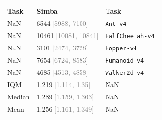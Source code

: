 \begin{tabular}{lll}
\toprule
Task & Simba & \textbf{Task} \\
\midrule
NaN & 6544 \textcolor{gray}{[5988, 7100]} & \texttt{Ant-v4} \\
NaN & 10461 \textcolor{gray}{[10081, 10841]} & \texttt{HalfCheetah-v4} \\
NaN & 3101 \textcolor{gray}{[2474, 3728]} & \texttt{Hopper-v4} \\
NaN & 7654 \textcolor{gray}{[6724, 8583]} & \texttt{Humanoid-v4} \\
NaN & 4685 \textcolor{gray}{[4513, 4858]} & \texttt{Walker2d-v4} \\
IQM & 1.219 \textcolor{gray}{[1.114, 1.35]} & NaN \\
Median & 1.289 \textcolor{gray}{[1.159, 1.363]} & NaN \\
Mean & 1.256 \textcolor{gray}{[1.161, 1.349]} & NaN \\
\bottomrule
\end{tabular}
